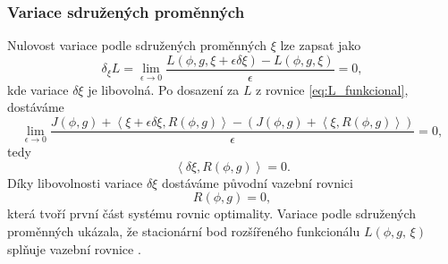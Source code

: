 \subsubsection{Variace sdružených proměnných}
Nulovost variace podle sdružených proměnných $ \xi $ lze zapsat jako
\begin{equation}
\delta_\xi L = \lim\limits_{\epsilon\rightarrow0}\dfrac{L(\phi,g,\xi+\epsilon\delta\xi)-L(\phi,g,\xi)}{\epsilon}=0,
\end{equation}
kde variace $ \delta\xi $ je libovolná. Po dosazení za $ L $ z rovnice \ref{eq:L_funkcional}, dostáváme
\begin{equation}
\lim\limits_{\epsilon\rightarrow0} \dfrac
{J(\phi, g) +  \left\langle\xi+\epsilon\delta\xi, R(\phi, g)\right\rangle - (J(\phi, g) +   \left\langle\xi , R(\phi, g)\right\rangle ) }{\epsilon}
=0,
\end{equation}
tedy 
\begin{equation}
 \left\langle\delta\xi , R(\phi, g) \right\rangle = 0.
\end{equation}
Díky libovolnosti variace $ \delta\xi $ dostáváme původní vazební rovnici 
\begin{equation}\label{eq:vazebni_rce}
R(\phi, g)=0,
\end{equation}
která tvoří první část systému rovnic optimality. Variace podle sdružených proměnných ukázala, že stacionární bod rozšířeného funkcionálu $ L(\phi, g,\,\xi)  $ splňuje vazební rovnice \cite{karman1997inverse}.

